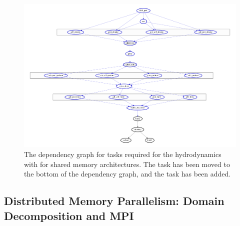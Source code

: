 \begin{figure}
 \centering
 \includegraphics[width=\textwidth]{figures/Meshless/tasks_hydro_nompi.pdf}%
 \caption{
The dependency graph for tasks required for the hydrodynamics with \swift for shared memory
architectures. The  task has been moved to the bottom of the dependency graph, and the
 task has been added.
}
 \label{fig:dependency-graph-nompi}
\end{figure}





\subsection{Distributed Memory Parallelism: Domain Decomposition and MPI}


